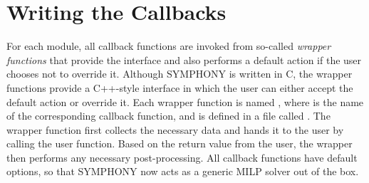 \section{Writing the Callbacks}

For each module, all callback functions are invoked from so-called
\emph{wrapper functions} that provide the interface and also performs a
default action if the user chooses not to override it. Although SYMPHONY is
written in C, the wrapper functions provide a C++-style interface in which the
user can either accept the default action or override it. Each wrapper
function is named  , where \code{*} is the name of the
corresponding callback function, and is defined in a file called
. The wrapper function first collects the necessary data
and hands it to the user by calling the user function. Based on the return
value from the user, the wrapper then performs any necessary post-processing.
All callback functions have default options, so that SYMPHONY now acts as a
generic MILP solver out of the box.

